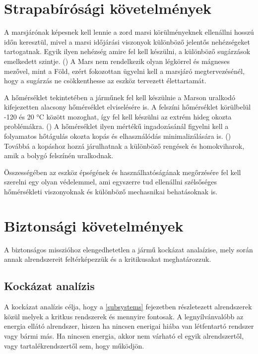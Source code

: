 \documentclass[12pt]{report}
\begin{document}
\section{Strapabírósági követelmények} \label{strapabirosag}
A marsjárónak képesnek kell lennie a zord marsi körülményeknek ellenállni hosszú időn keresztül, mivel a marsi időjárási viszonyok különböző jelentős nehézségeket tartogatnak. Egyik ilyen nehézség amire fel kell készülni, a különböző sugárzások emelkedett szintje. () A Mars nem rendelkezik olyan légkörrel és 
mágneses mezővel, mint a Föld, ezért fokozottan ügyelni kell a marsjáró megtervezésénél, hogy a sugárzás ne csökkenthesse az eszköz tervezett élettartamát. 

A hőmérséklet tekintetében a járműnek fel kell készülnie a Marson uralkodó kifejezetten alacsony hőmérséklet elviselésére is. A felszíni hőmérséklet körülbelül  -120 és 20 °C között mozoghat, így fel kell készülni az extrém hideg okozta problémákra. () A hőmérséklet ilyen mértékű ingadozásánál figyelni kell a folyamatos hőtágulás okozta kopás és elhasználódás minimalizálására is. () Továbbá a kopáshoz hozzá járulhatnak a különböző rengések és homokviharok, amik a bolygó felszínén uralkodnak.

Összességében az eszköz épségének és használhatóságának megőrzésére fel kell szerelni egy olyan védelemmel, ami egyszerre tud ellenállni szélsőséges hőmérsékleti viszonyoknak és különböző mechasnikai behatásoknak is.


\section{Biztonsági követelmények}

A biztonságos misszióhoz elengedhetetlen a jármű kockázat analaízise, mely során annak alrendszereit feltérképezzük és a kritikusakat meghatározzuk. 

\subsection{Kockázat analízis}

A kockázat analízis célja, hogy a \ref{subsystems} fejezetben részletezett alrendszerek közül melyek a kritkus rendszerek és mennyire fontosak. A legnyílvánvalóbb az energia ellátó alrendszer, hiszen ha nincsen enerigai hiába van létfentartó rendszer vagy bármi más. Ha nincsen energia, akkor nem várható el egyik alrendszertől, vagy tartalékrendszertől sem, hogy működjön.
\end{document}
